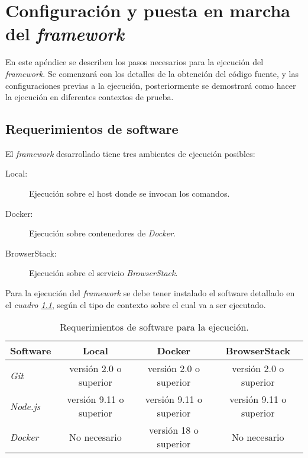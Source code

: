 \chapter{Configuración y puesta en marcha del \emph{framework}}
\label{appendix_execution}

En este apéndice se describen los pasos necesarios para la ejecución del
\emph{framework}. Se comenzará con los detalles de la obtención del código
fuente, y las configuraciones previas a la ejecución, posteriormente se
demostrará como hacer la ejecución en diferentes contextos de prueba.

\section{Requerimientos de software}
El \emph{framework} desarrollado tiene tres ambientes de ejecución posibles:

\begin{description}
\item [Local:] Ejecución sobre el host donde se invocan los comandos.
\item [Docker:] Ejecución sobre contenedores de \emph{Docker}.
\item [BrowserStack:] Ejecución sobre el servicio \emph{BrowserStack}.
\end{description}

Para la ejecución del \emph{framework} se debe tener instalado el software
detallado en el \emph{cuadro \ref{requirements}}, según el tipo de contexto
sobre el cual va a ser ejecutado.

\begin{table}[H]
\centering
\begin{tabular}{|l|c|c|c|}
\hline
\footnotesize{\textbf{Software}} &
\footnotesize{\textbf{Local}} &
\footnotesize{\textbf{Docker}} &
\footnotesize{\textbf{BrowserStack}} \\
\hline
\footnotesize{\emph{Git}} &
\footnotesize{versión 2.0 o superior} &
\footnotesize{versión 2.0 o superior} &
\footnotesize{versión 2.0 o superior} \\
\hline
\footnotesize{\emph{Node.js}} &
\footnotesize{versión 9.11 o superior} &
\footnotesize{versión 9.11 o superior} &
\footnotesize{versión 9.11 o superior} \\
\hline
\footnotesize{\emph{Docker}} &
\footnotesize{No necesario} &
\footnotesize{versión 18 o superior} &
\footnotesize{No necesario} \\
\hline
\end{tabular}
\caption{Requerimientos de software para la ejecución.}
\label{requirements}
\end{table}

